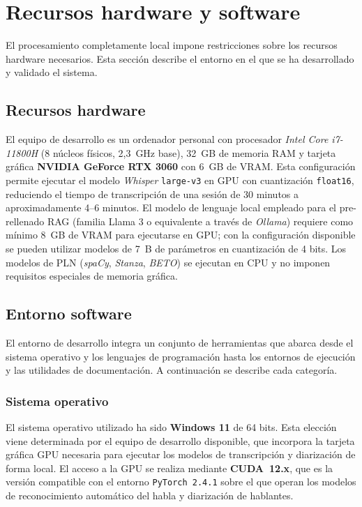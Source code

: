 \section{Recursos hardware y software}
\label{sec:recursos}

El procesamiento completamente local impone restricciones sobre los recursos hardware
necesarios. Esta sección describe el entorno en el que se ha desarrollado y validado
el sistema.


\subsection{Recursos hardware}
\label{subsec:hardware}

El equipo de desarrollo es un ordenador personal con procesador \emph{Intel Core i7-11800H}
(8 núcleos físicos, 2,3~GHz base), 32~GB de memoria RAM y tarjeta gráfica \textbf{NVIDIA
GeForce RTX 3060} con 6~GB de VRAM. Esta configuración permite ejecutar el modelo
\emph{Whisper} \texttt{large-v3} en \ac{GPU} con cuantización \texttt{float16},
reduciendo el tiempo de transcripción de una sesión de 30 minutos a aproximadamente
4--6 minutos. El modelo de lenguaje local empleado para el pre-rellenado \ac{RAG}
(familia Llama 3 o equivalente a través de \emph{Ollama}) requiere como mínimo 8~GB de
VRAM para ejecutarse en \ac{GPU}; con la configuración disponible se pueden utilizar
modelos de 7~B de parámetros en cuantización de 4 bits. Los modelos de \ac{PLN}
(\emph{spaCy}, \emph{Stanza}, \emph{BETO}) se ejecutan en \ac{CPU} y no imponen
requisitos especiales de memoria gráfica.


\subsection{Entorno software}
\label{subsec:software}

El entorno de desarrollo integra un conjunto de herramientas que abarca desde el
sistema operativo y los lenguajes de programación hasta los entornos de ejecución y
las utilidades de documentación. A continuación se describe cada categoría.


\subsubsection{Sistema operativo}

El sistema operativo utilizado ha sido \textbf{Windows 11} de 64 bits. Esta
elección viene determinada por el equipo de desarrollo disponible, que incorpora la
tarjeta gráfica \ac{GPU} necesaria para ejecutar los modelos de transcripción y
diarización de forma local. El acceso a la \ac{GPU} se realiza mediante
\textbf{CUDA~12.x}, que es la versión compatible con el entorno
\texttt{PyTorch~2.4.1} sobre el que operan los modelos de reconocimiento
automático del habla y diarización de hablantes.


